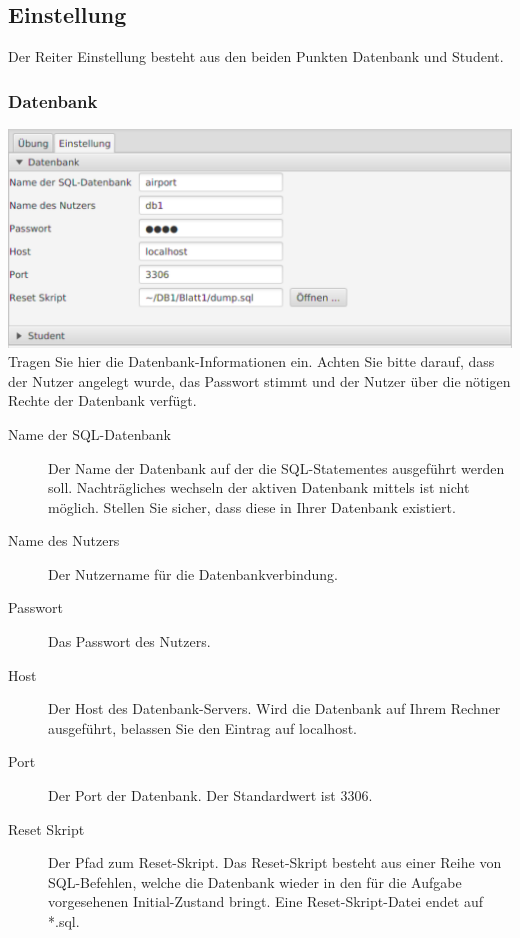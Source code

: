 \documentclass[11pt]{article}
\begin{document}
\subsection{Einstellung}
\label{subsec:Einstellung}
Der Reiter Einstellung besteht aus den beiden Punkten Datenbank und Student.

\subsubsection{Datenbank}
\label{subsubsec:Datenbank}
\includegraphics[width=1.0\textwidth]{figures/db}
Tragen Sie hier die Datenbank-Informationen ein. Achten Sie bitte darauf, dass der Nutzer angelegt wurde, das Passwort stimmt und der Nutzer über die nötigen Rechte der Datenbank verfügt.

\begin{description}
	\item[Name der SQL-Datenbank] Der Name der Datenbank auf der die SQL-Statementes ausgeführt werden soll. Nachträgliches wechseln der aktiven Datenbank mittels  ist nicht möglich. Stellen Sie sicher, dass diese in Ihrer Datenbank existiert.
	\item[Name des Nutzers] Der Nutzername für die Datenbankverbindung.
	\item[Passwort] Das Passwort des Nutzers.
	\item[Host] Der Host des Datenbank-Servers. Wird die Datenbank auf Ihrem Rechner ausgeführt, belassen Sie den Eintrag auf localhost.
	\item[Port] Der Port der Datenbank. Der Standardwert ist 3306.
	\item[Reset Skript] Der Pfad zum Reset-Skript. Das Reset-Skript besteht aus einer Reihe von SQL-Befehlen, welche die Datenbank wieder in den für die Aufgabe vorgesehenen Initial-Zustand bringt. Eine Reset-Skript-Datei endet auf *.sql.
\end{description}
\end{document}
